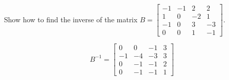 
\begin{exerciseStatement}


Show how to find the inverse of the matrix \(B= \left[\begin{array}{cccc}
-1 & -1 & 2 & 2 \\
1 & 0 & -2 & 1 \\
-1 & 0 & 3 & -3 \\
0 & 0 & 1 & -1
\end{array}\right] \).


\end{exerciseStatement}
    
\begin{exerciseAnswer} 
\[B^{-1}= \left[\begin{array}{cccc}
0 & 0 & -1 & 3 \\
-1 & -4 & -3 & 3 \\
0 & -1 & -1 & 2 \\
0 & -1 & -1 & 1
\end{array}\right] \]
\end{exerciseAnswer}
    
